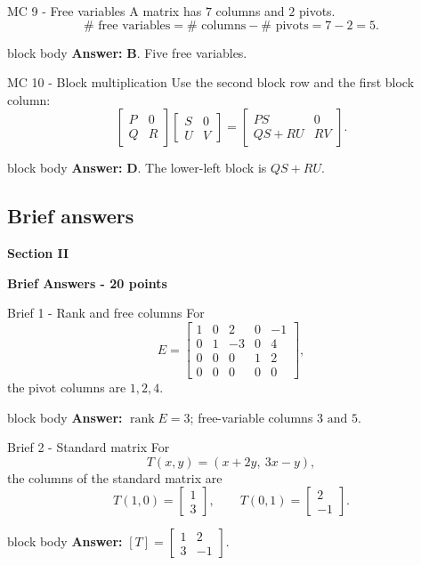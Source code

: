 \documentclass[aspectratio=169]{beamer}
\newcommand{\rank}{\operatorname{rank}}
\newcommand{\sectioncard}[2]{%
  \begin{frame}[plain]
    \vfill\centering
    {\Huge\color{lectureorange}\bfseries #1}\par\bigskip
    {\LARGE\color{lecturegreen}\bfseries #2}
    \vfill
  \end{frame}}
\newcommand{\answerbox}[1]{%
  \begin{beamercolorbox}[sep=1.0ex,wd=\linewidth]{block body}
    \textbf{Answer:} #1
  \end{beamercolorbox}}
\begin{document}
\begin{frame}{MC 9 - Free variables}
A matrix has $7$ columns and $2$ pivots.
\[
\#\text{ free variables}
=\#\text{ columns}-\#\text{ pivots}
=7-2=5.
\]
\answerbox{\textbf{B}. Five free variables.}
\end{frame}

\begin{frame}{MC 10 - Block multiplication}
Use the second block row and the first block column:
\[
\begin{bmatrix}P&0\\Q&R\end{bmatrix}
\begin{bmatrix}S&0\\U&V\end{bmatrix}
=
\begin{bmatrix}
PS&0\\
QS+RU&RV
\end{bmatrix}.
\]
\answerbox{\textbf{D}. The lower-left block is $QS+RU$.}
\end{frame}

\subsection{Brief answers}
\sectioncard{Section II}{Brief Answers - 20 points}

\begin{frame}{Brief 1 - Rank and free columns}
For
\[
E=\begin{bmatrix}
1&0&2&0&-1\\
0&1&-3&0&4\\
0&0&0&1&2\\
0&0&0&0&0
\end{bmatrix},
\]
the pivot columns are $1,2,4$.
\answerbox{$\rank E=\boxed{3}$; free-variable columns $\boxed{3\text{ and }5}$.}
\end{frame}

\begin{frame}{Brief 2 - Standard matrix}
For
\[
T(x,y)=(x+2y,\ 3x-y),
\]
the columns of the standard matrix are
\[
T(1,0)=\begin{bmatrix}1\\3\end{bmatrix},
\qquad
T(0,1)=\begin{bmatrix}2\\-1\end{bmatrix}.
\]
\answerbox{$\displaystyle \boxed{[T]=\begin{bmatrix}1&2\\3&-1\end{bmatrix}}$.}
\end{frame}
\end{document}
